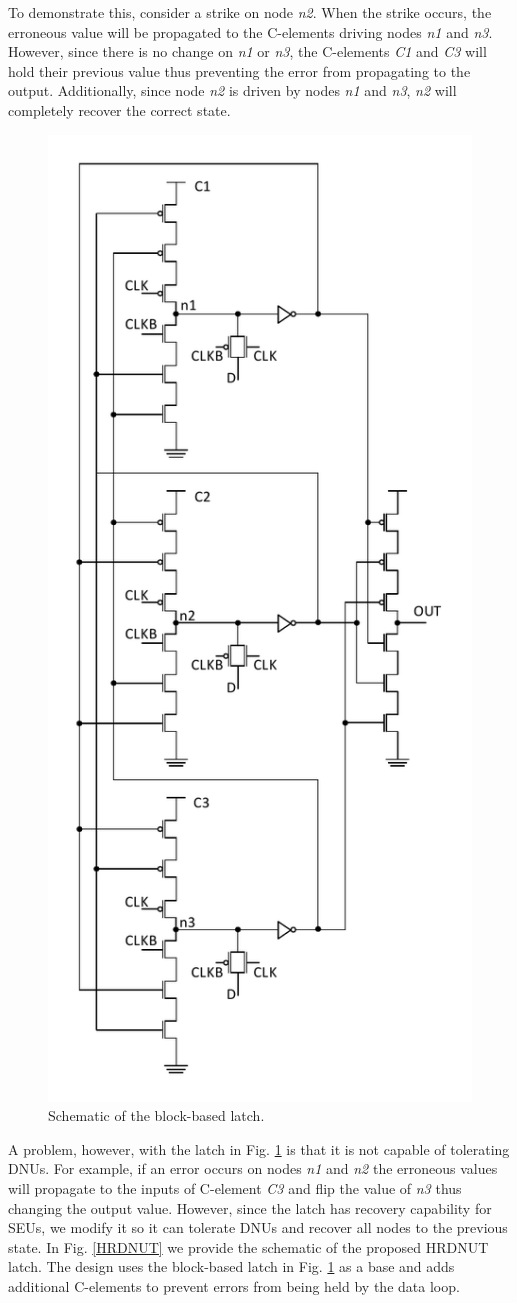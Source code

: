 To demonstrate this, consider a strike on node \textit{n2}. When the strike occurs, the erroneous value will be propagated to the C-elements driving nodes \textit{n1} and \textit{n3}. However, since there is no change on \textit{n1} or \textit{n3}, the C-elements \textit{C1} and \textit{C3} will hold their previous value thus preventing the error from propagating to the output. Additionally, since node \textit{n2} is driven by nodes \textit{n1} and \textit{n3}, \textit{n2} will completely recover the correct state. 

\begin{figure}[!htbp]
	\centering
	\includegraphics[width=0.55\linewidth]{Figures/BLatch}
	\caption{Schematic of the block-based latch.}
	\label{BLatch}
\end{figure} 

A problem, however, with the latch in Fig. \ref{BLatch} is that it is not capable of tolerating DNUs. For example, if an error occurs on nodes \textit{n1} and \textit{n2} the erroneous values will propagate to the inputs of C-element \textit{C3} and flip the value of \textit{n3} thus changing the output value. However, since the latch has recovery capability for SEUs, we modify it so it can tolerate DNUs and recover all nodes to the previous state. In Fig. \ref{HRDNUT} we provide the schematic of the proposed HRDNUT latch. The design uses the block-based latch in Fig. \ref{BLatch} as a base and adds additional C-elements to prevent errors from being held by the data loop.  

